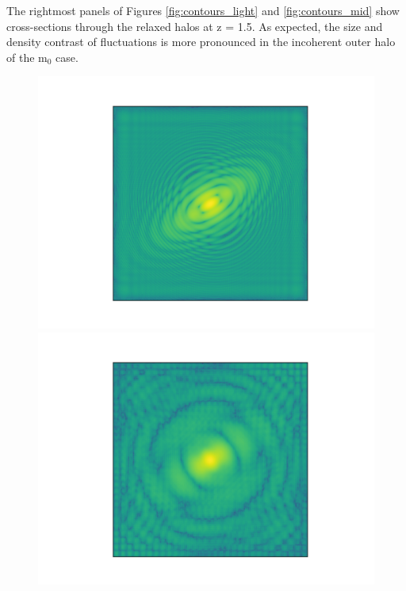 \documentclass[a4paper,11pt]{article}
\begin{document}
The rightmost panels of Figures \ref{fig:contours_light} and \ref{fig:contours_mid} show cross-sections through the relaxed halos at z = 1.5. As expected, the size and density contrast of fluctuations is more pronounced in the incoherent outer halo of the $\mathrm{m}_0$ case. 



\begin{figure}[!htb]
  \includegraphics[trim={3cm 0 0 0}, scale=0.5]{single_light_plane_1.png}
\endminipage\hfill
{}
  \includegraphics[trim={3cm 0 0 0},scale=0.5]{single_light_plane_7.png}
\endminipage\hfill
{}

\end{figure}
\end{document}
